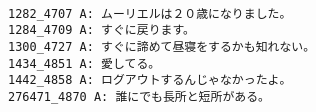 \documentclass[a4paper,11pt]{report} %
\begin{document}
\begin{CJK}{UTF8}{min}

\begin{verbatim}

1282_4707 A: ムーリエルは２０歳になりました。
1284_4709 A: すぐに戻ります。
1300_4727 A: すぐに諦めて昼寝をするかも知れない。
1434_4851 A: 愛してる。
1442_4858 A: ログアウトするんじゃなかったよ。
276471_4870 A: 誰にでも長所と短所がある。

\end{verbatim}
\end{CJK} 
\end{document}
